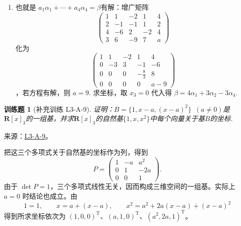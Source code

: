 \documentclass[UTF8,12pt,a4paper,fontset=fandol]{ctexart}
\newtheorem{exercise}{训练题}[section]
\begin{document}
\begin{solve}
\begin{enumerate}
                \item 也就是 $a_1\alpha_1+\cdots+a_4\alpha_4=\beta$有解：增广矩阵 
\[\begin{pmatrix}
                              1 & 1  & -2 & 1  & 4 \\
                              2 & -1 & -1 & 1  & 2 \\
                              4 & -6 & 2  & -2 & 4 \\
                              3 & 6  & -9 & 7  & a\end{pmatrix}\]
化为 
\[\begin{pmatrix}
                              1 & 1  & -2 & 1         & 4   \\
                              0 & -3 & 3  & -1        & -6  \\
                              0 & 0  & 0  & -\frac 83 & 8   \\
                              0 & 0  & 0  & 0         & a-9\end{pmatrix}\]
，若方程有解，则 $a=9$. 求坐标，取 $x_3=0$ 代入得 $\beta=4\alpha_1+3\alpha_2-3\alpha_4$.
            \end{enumerate}
\end{solve}

\begin{exercise}[补充训练 L3-A-9]\label{prob:L3-A-9}
证明：$B=\{1,x-a,(x-a)^2\}\enspace(a\neq 0)$是$\mathbf{R}[x]_3$的一组基，并求$\mathbf{R}[x]_3$的自然基$\{1,x,x^2\}$中每个向量关于基$B$的坐标.
\end{exercise}
\noindent 来源：\href{https://github.com/yhwu-is/Linear-Algebra-Left-Undone/blob/new/%E8%AE%B2%E4%B9%89/%E4%B8%93%E9%A2%98/3%20%E6%9C%89%E9%99%90%E7%BB%B4%E7%BA%BF%E6%80%A7%E7%A9%BA%E9%97%B4.tex}{L3-A-9}。
\begin{solve}
把这三个多项式关于自然基的坐标作为列，得到
\[P=\begin{pmatrix}1&-a&a^2\\0&1&-2a\\0&0&1\end{pmatrix}.\]
由于 $\det P=1$，三个多项式线性无关，因而构成三维空间的一组基。实际上 $a=0$ 时结论也成立。由
\[1=1,\qquad x=a+(x-a),\qquad x^2=a^2+2a(x-a)+(x-a)^2\]
得到所求坐标依次为 $(1,0,0)^{\mathrm T}$、$(a,1,0)^{\mathrm T}$、$(a^2,2a,1)^{\mathrm T}$。
\end{solve}
\end{document}
